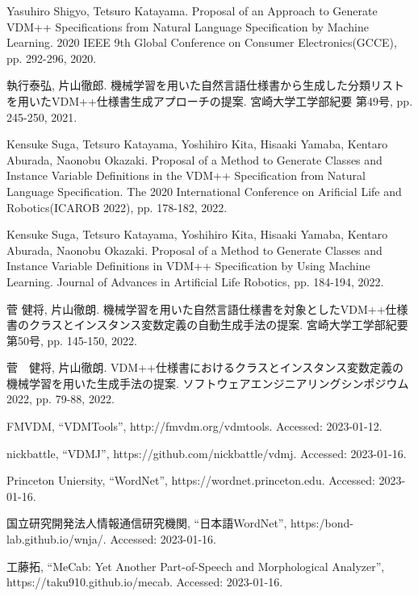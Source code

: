 \documentclass[uplatex, report, a4j, 10pt]{jsbook}
\begin{document}
\begin{thebibliography}{10}
     Yasuhiro Shigyo, Tetsuro Katayama. 
    Proposal of an Approach to Generate VDM++ Specifications from Natural Language Specification by Machine Learning. 
    2020 IEEE 9th Global Conference on Consumer Electronics(GCCE), 
    pp. 292-296, 2020.

    執行泰弘, 片山徹郎. 
    機械学習を用いた自然言語仕様書から生成した分類リストを用いたVDM++仕様書生成アプローチの提案. 
    宮崎大学工学部紀要 第49号, 
    pp. 245-250, 2021.

     Kensuke Suga, Tetsuro Katayama, Yoshihiro Kita, Hisaaki Yamaba, Kentaro Aburada, Naonobu Okazaki.
    Proposal of a Method to Generate Classes and Instance Variable Definitions in the VDM++ Specification from Natural Language Specification.
    The 2020 International Conference on Arificial Life and Robotics(ICAROB 2022), 
    pp. 178-182, 2022.

     Kensuke Suga, Tetsuro Katayama, Yoshihiro Kita, Hisaaki Yamaba, Kentaro Aburada, Naonobu Okazaki.
    Proposal of a Method to Generate Classes and Instance Variable Definitions in VDM++ Specification by Using Machine Learning.
    Journal of Advances in Artificial Life Robotics,
    pp. 184-194, 2022.

     菅 健将, 片山徹朗.
    機械学習を用いた自然言語仕様書を対象としたVDM++仕様書のクラスとインスタンス変数定義の自動生成手法の提案.
    宮崎大学工学部紀要 第50号,
    pp. 145-150, 2022.


     菅　健将, 片山徹朗.
    VDM++仕様書におけるクラスとインスタンス変数定義の機械学習を用いた生成手法の提案.
    ソフトウェアエンジニアリングシンポジウム2022,
    pp. 79-88, 2022.

    FMVDM, “VDMTools”, http:\slash \slash fmvdm.org\slash vdmtools. Accessed: 2023-01-12.

    nickbattle, “VDMJ”, https:\slash \slash github.com\slash nickbattle\slash vdmj. Accessed: 2023-01-16.

    Princeton Uniersity, ``WordNet'', https:\slash \slash wordnet.princeton.edu. Accessed: 2023-01-16.

    国立研究開発法人情報通信研究機関, ``日本語WordNet'', https:\slash bond-lab.github.io\slash wnja\slash. Accessed: 2023-01-16.

    工藤拓, “MeCab: Yet Another Part-of-Speech and Morphological Analyzer”,  https:\slash \slash taku910.github.io\slash mecab. Accessed: 2023-01-16.


\end{thebibliography}
\end{document}

